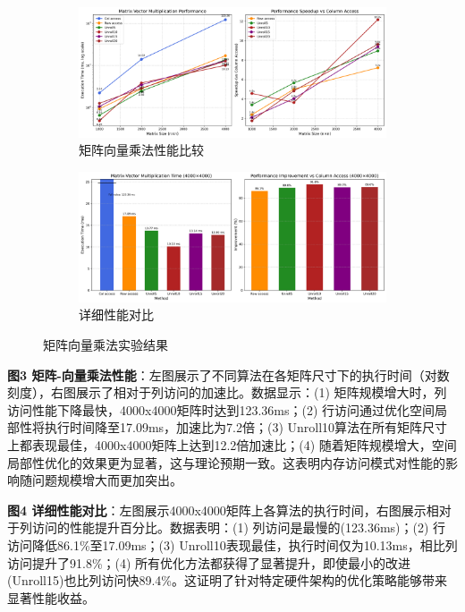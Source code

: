 \documentclass[a4paper,colorlinks=true,linkcolor=blue,urlcolor=blue,citecolor=green,bookmarks=true]{article}
\begin{document}
\begin{figure}[htbp]
  \centering
  \begin{subfigure}[b]{0.45\textwidth}
    \centering
    \includegraphics[width=\textwidth]{matrix_vector_performance.png}
    \caption{矩阵向量乘法性能比较}
    \label{fig:matrix_vector_performance}
  \end{subfigure}
  \hfill
  \begin{subfigure}[b]{0.45\textwidth}
    \centering
    \includegraphics[width=\textwidth]{matrix_vector_detail_performance.png}
    \caption{详细性能对比}
    \label{fig:detail_performance}
  \end{subfigure}
  \caption{矩阵向量乘法实验结果}
  \label{fig:matrix_results}
\end{figure}

\textbf{图3 矩阵-向量乘法性能}：左图展示了不同算法在各矩阵尺寸下的执行时间（对数刻度），右图展示了相对于列访问的加速比。数据显示：(1) 矩阵规模增大时，列访问性能下降最快，4000x4000矩阵时达到123.36ms；(2) 行访问通过优化空间局部性将执行时间降至17.09ms，加速比为7.2倍；(3) Unroll10算法在所有矩阵尺寸上都表现最佳，4000x4000矩阵上达到12.2倍加速比；(4) 随着矩阵规模增大，空间局部性优化的效果更为显著，这与理论预期一致。这表明内存访问模式对性能的影响随问题规模增大而更加突出。

\textbf{图4 详细性能对比}：左图展示4000x4000矩阵上各算法的执行时间，右图展示相对于列访问的性能提升百分比。数据表明：(1) 列访问是最慢的(123.36ms)；(2) 行访问降低86.1\%至17.09ms；(3) Unroll10表现最佳，执行时间仅为10.13ms，相比列访问提升了91.8\%；(4) 所有优化方法都获得了显著提升，即使最小的改进(Unroll15)也比列访问快89.4\%。这证明了针对特定硬件架构的优化策略能够带来显著性能收益。
\end{document}

